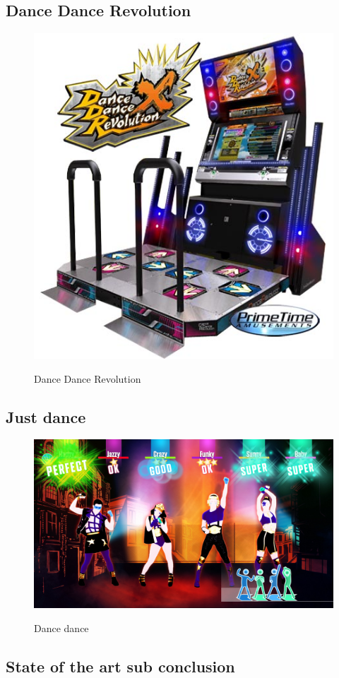 \subsection{Dance Dance Revolution}
\begin{figure}[H]
	\centering
	\includegraphics[width=0.7\linewidth]{figure/Analysis/dancedance}
	\label{fig:dancedance}
	\caption{Dance Dance Revolution}
\end{figure}

\subsection{Just dance}
\begin{figure}[H]
	\centering
	\includegraphics[width=0.7\linewidth]{figure/Analysis/justdance}
	\label{fig:Just Dance}
	\caption{Dance dance}
\end{figure}



	 
	\subsection{State of the art sub conclusion}


